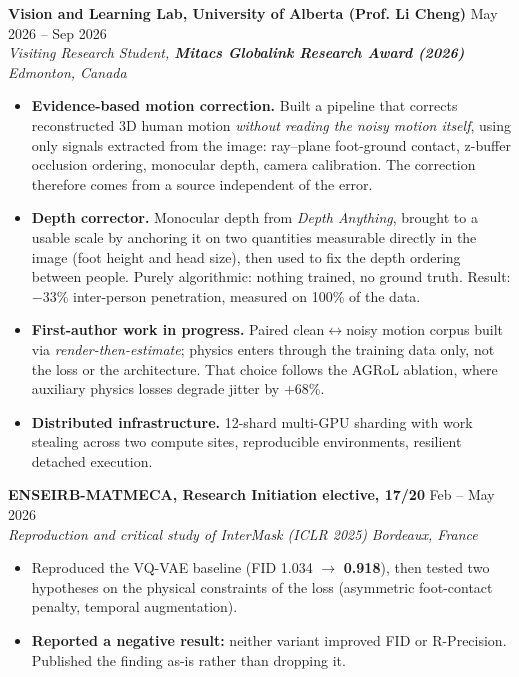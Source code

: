 \documentclass[10pt, letterpaper]{article}
\newcommand{\entry}[4]{%
  \noindent \textbf{#1} \hfill #2 \\
  \textit{#3} \hfill \textit{#4} \par
}
\begin{document}
\entry{Vision and Learning Lab, University of Alberta (Prof. Li Cheng)}{May 2026 -- Sep 2026}%
{Visiting Research Student, \textbf{Mitacs Globalink Research Award (2026)}}{Edmonton, Canada}
\begin{itemize}
    \item \textbf{Evidence-based motion correction.} Built a pipeline that corrects reconstructed 3D human motion \textit{without reading the noisy motion itself}, using only signals extracted from the image: ray--plane foot-ground contact, z-buffer occlusion ordering, monocular depth, camera calibration. The correction therefore comes from a source independent of the error.
    \item \textbf{Depth corrector.} Monocular depth from \textit{Depth Anything}, brought to a usable scale by anchoring it on two quantities measurable directly in the image (foot height and head size), then used to fix the depth ordering between people. Purely algorithmic: nothing trained, no ground truth. Result: $-$33\% inter-person penetration, measured on 100\% of the data.
    \item \textbf{First-author work in progress.} Paired clean$\leftrightarrow$noisy motion corpus built via \textit{render-then-estimate}; physics enters through the training data only, not the loss or the architecture. That choice follows the AGRoL ablation, where auxiliary physics losses degrade jitter by +68\%.
    \item \textbf{Distributed infrastructure.} 12-shard multi-GPU sharding with work stealing across two compute sites, reproducible environments, resilient detached execution.
\end{itemize}

\vspace{4pt}

\entry{ENSEIRB-MATMECA, Research Initiation elective, 17/20}{Feb -- May 2026}%
{Reproduction and critical study of \textit{InterMask} (ICLR 2025)}{Bordeaux, France}
\begin{itemize}
    \item Reproduced the VQ-VAE baseline (FID 1.034 $\to$ \textbf{0.918}), then tested two hypotheses on the physical constraints of the loss (asymmetric foot-contact penalty, temporal augmentation).
    \item \textbf{Reported a negative result:} neither variant improved FID or R-Precision. Published the finding as-is rather than dropping it.
\end{itemize}

\end{document}
